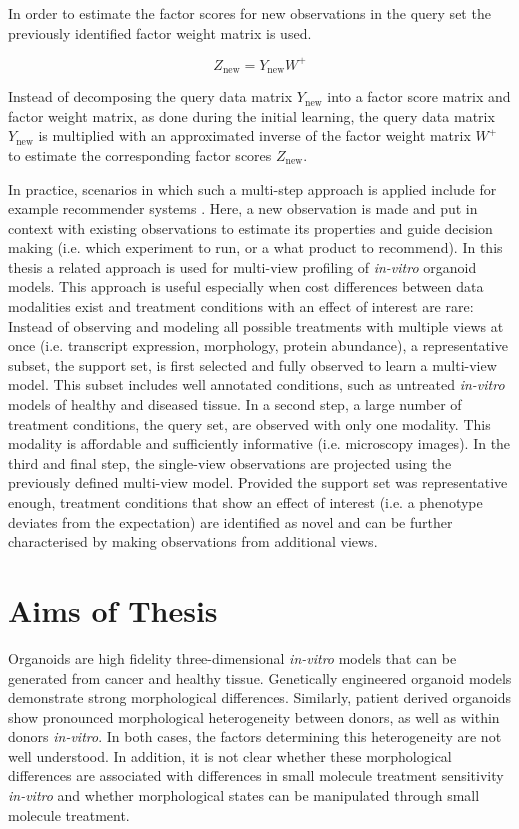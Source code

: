 \begin{flushleft}
In order to estimate the factor scores for new observations in the query set the previously identified factor weight matrix is used. 

\begin{equation}
    Z_{\text{new}} = Y_{\text{new}} W^+
\end{equation}

Instead of decomposing the query data matrix \(Y_{\text{new}}\) into a factor score matrix and factor weight matrix, as done during the initial learning, the query data matrix  \(Y_{\text{new}}\) is multiplied with an approximated inverse of the factor weight matrix \( W^+ \) to estimate the corresponding factor scores \( Z_{\text{new}} \).
\par

In practice, scenarios in which such a multi-step approach is applied include for example recommender systems \parencite{korenMatrixFactorizationTechniques2009}. Here, a new observation is made and put in context with existing observations to estimate its properties and guide decision making (i.e. which experiment to run, or a what product to recommend). In this thesis a related approach is used for multi-view profiling of \textit{in-vitro} organoid models. This approach is useful especially when cost differences between data modalities exist and treatment conditions with an effect of interest are rare: Instead of observing and modeling all possible treatments with multiple views at once (i.e. transcript expression, morphology, protein abundance), a representative subset, the support set, is first selected and fully observed to learn a multi-view model. This subset includes well annotated conditions, such as untreated \textit{in-vitro} models of healthy and diseased tissue. In a second step, a large number of treatment conditions, the query set, are observed with only one modality. This modality is affordable and sufficiently informative (i.e. microscopy images). In the third and final step, the single-view observations are projected using the previously defined multi-view model. Provided the support set was representative enough, treatment conditions that show an effect of interest (i.e. a phenotype deviates from the expectation) are identified as novel and can be further characterised by making observations from additional views.

\newpage
\section{Aims of Thesis}
Organoids are high fidelity three-dimensional \textit{in-vitro} models that can be generated from cancer and healthy tissue. Genetically engineered organoid models demonstrate strong morphological differences. Similarly, patient derived organoids show pronounced morphological heterogeneity between donors, as well as within donors \textit{in-vitro}. In both cases, the factors determining this heterogeneity are not well understood. In addition, it is not clear whether these morphological differences are associated with differences in small molecule treatment sensitivity \textit{in-vitro} and whether morphological states can be manipulated through small molecule treatment.
\bigbreak


\end{flushleft}
